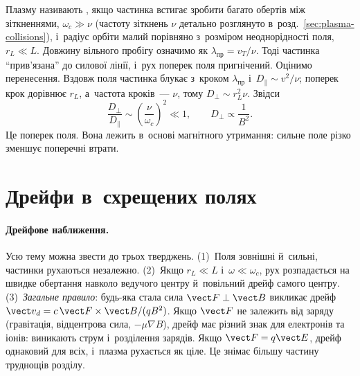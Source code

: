 Плазму називають , якщо частинка встигає зробити багато обертів між
зіткненнями, $\omega_c\gg\nu$ (частоту зіткнень $\nu$ детально розглянуто в~розд.~\ref{sec:plasma-collisions}), і~радіус орбіти малий порівняно з~розміром неоднорідності
поля, $r_L\ll L$. Довжину вільного пробігу означимо як $\lambda_{\mathrm{пр}}=v_T/\nu$. Тоді частинка \enquote{прив'язана} до силової лінії, і~рух поперек поля
пригнічений. Оцінимо перенесення. Вздовж поля частинка блукає з~кроком
$\lambda_{\mathrm{пр}}$ і~$D_\parallel\sim v^2/\nu$; поперек крок дорівнює $r_L$,
а~частота кроків~--- $\nu$, тому $D_\perp\sim r_L^2\nu$. Звідси
\begin{equation*}
	\frac{D_\perp}{D_\parallel}\sim\left(\frac\nu{\omega_c}\right)^2\ll1,\qquad D_\perp\propto\frac1{B^2}.
\end{equation*}
Це  поперек поля. Вона лежить в~основі магнітного утримання:
сильне поле різко зменшує поперечні втрати.



\section{Дрейфи в~схрещених полях}



\paragraph{Дрейфове наближення.}
Усю тему можна звести до трьох тверджень. (1)~Поля зовнішні й~сильні, частинки рухаються незалежно.
(2)~Якщо $r_L\ll L$ і~$\omega\ll\omega_c$, рух розпадається на швидке обертання навколо ведучого центру й~повільний дрейф самого центру.
(3)~\emph{Загальне правило}: будь-яка стала сила $\vect F\perp\vect B$ викликає дрейф $\vect v_d=c\,\vect F\times\vect B/(qB^2)$.
Якщо $\vect F$ не залежить від заряду (гравітація, відцентрова сила, $-\mu\nabla B$), дрейф має різний знак для електронів та іонів:
виникають струм і~розділення зарядів. Якщо $\vect F=q\vect E$, дрейф однаковий для всіх, і~плазма рухається як ціле.
Це знімає більшу частину труднощів розділу.

